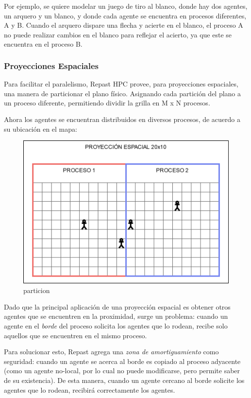Por ejemplo, se quiere modelar un juego de tiro al blanco, donde hay dos
agentes, un arquero y un blanco, y donde cada agente se encuentra en
procesos diferentes, A y B. Cuando el arquero dispare una flecha y
acierte en el blanco, el proceso A no puede realizar cambios en el
blanco para reflejar el acierto, ya que este se encuentra en el proceso
B.

\subsubsection{Proyecciones Espaciales}

Para facilitar el paralelismo, Repast HPC provee, para proyecciones
espaciales, una manera de particionar el plano físico. Asignando cada
partición del plano a un proceso diferente, permitiendo dividir la
grilla en M x N procesos.

Ahora los agentes se encuentran distribuidos en diversos procesos, de
acuerdo a su ubicación en el mapa:

\begin{figure}
	\centering
	\includegraphics{process_01.png}
	\caption{particion}
\end{figure}

Dado que la principal aplicación de una proyección espacial es obtener
otros agentes que se encuentren en la proximidad, surge un problema:
cuando un agente en el \emph{borde} del proceso solicita los agentes que
lo rodean, recibe solo aquellos que se encuentren en el mismo proceso.

Para solucionar esto, Repast agrega una \emph{zona de amortiguamiento}
como seguridad: cuando un agente se acerca al borde es copiado al
proceso adyacente (como un agente no-local, por lo cual no puede
modificarse, pero permite saber de su existencia). De esta manera,
cuando un agente cercano al borde solicite los agentes que lo rodean,
recibirá correctamente los agentes.

